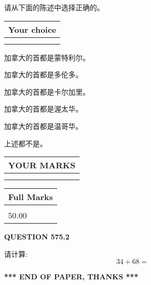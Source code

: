 \documentclass{ctexart}
\begin{document}
  
请从下面的陈述中选择正确的。
  
  
\noindent\hspace{3.0in} \begin{tabular}{|l|}
\hline
Your choice \\
\hline
 \\ 
 \\ 
\hline
\end{tabular}
  
  
 
 
加拿大的首都是蒙特利尔。
 
 
加拿大的首都是多伦多。
 
 
加拿大的首都是卡尔加里。
 
 
加拿大的首都是渥太华。
 
 
加拿大的首都是温哥华。
 
 
 上述都不是。
 
 
  
\vspace{0.2in}
  
\noindent\begin{tabular}{|l|}
\hline
 YOUR MARKS  \\
\hline
 \\ 
 \\ 
\hline
\end{tabular}
\hspace{0.05in} \begin{tabular}{|l|}
\hline
 Full Marks  \\
\hline
 \\ 
50.00 \\
\hline
\end{tabular}
{\textbf{\Large{QUESTION
575.2 
}}}
  
  
 
请计算:
\begin{equation}
34 +  %
68 = \nonumber
\end{equation}
 

 

 
   
   
 \vspace{0.2in}
 
   
   
   
   
\vspace{1.0in} 
{\textbf{\large{ *** END OF PAPER, THANKS *** }}} 
   
\end{document}
